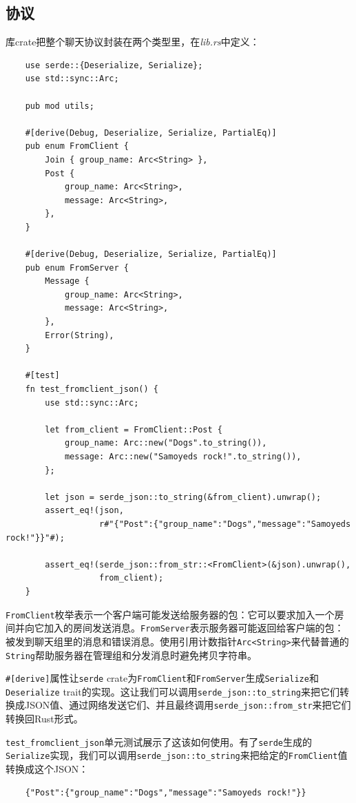 \subsection{协议}
库crate把整个聊天协议封装在两个类型里，在\emph{lib.rs}中定义：
\begin{verbatim}
    use serde::{Deserialize, Serialize};
    use std::sync::Arc;

    pub mod utils;

    #[derive(Debug, Deserialize, Serialize, PartialEq)]
    pub enum FromClient {
        Join { group_name: Arc<String> },
        Post {
            group_name: Arc<String>,
            message: Arc<String>,
        },
    }

    #[derive(Debug, Deserialize, Serialize, PartialEq)]
    pub enum FromServer {
        Message {
            group_name: Arc<String>,
            message: Arc<String>,
        },
        Error(String),
    }

    #[test]
    fn test_fromclient_json() {
        use std::sync::Arc;

        let from_client = FromClient::Post {
            group_name: Arc::new("Dogs".to_string()),
            message: Arc::new("Samoyeds rock!".to_string()),
        };

        let json = serde_json::to_string(&from_client).unwrap();
        assert_eq!(json,
                   r#"{"Post":{"group_name":"Dogs","message":"Samoyeds rock!"}}"#);
        
        assert_eq!(serde_json::from_str::<FromClient>(&json).unwrap(),
                   from_client);
    }
\end{verbatim}

\texttt{FromClient}枚举表示一个客户端可能发送给服务器的包：它可以要求加入一个房间并向它加入的房间发送消息。\texttt{FromServer}表示服务器可能返回给客户端的包：被发到聊天组里的消息和错误消息。使用引用计数指针\texttt{Arc<String>}来代替普通的\texttt{String}帮助服务器在管理组和分发消息时避免拷贝字符串。

\texttt{\#[derive]}属性让\texttt{serde} crate为\texttt{FromClient}和\texttt{FromServer}生成\texttt{Serialize}和\texttt{Deserialize} trait的实现。这让我们可以调用\texttt{serde\_json::to\_string}来把它们转换成JSON值、通过网络发送它们、并且最终调用\texttt{serde\_json::from\_str}来把它们转换回Rust形式。

\texttt{test\_fromclient\_json}单元测试展示了这该如何使用。有了\texttt{serde}生成的\texttt{Serialize}实现，我们可以调用\texttt{serde\_json::to\_string}来把给定的\texttt{FromClient}值转换成这个JSON：
\begin{verbatim}
    {"Post":{"group_name":"Dogs","message":"Samoyeds rock!"}}
\end{verbatim}

